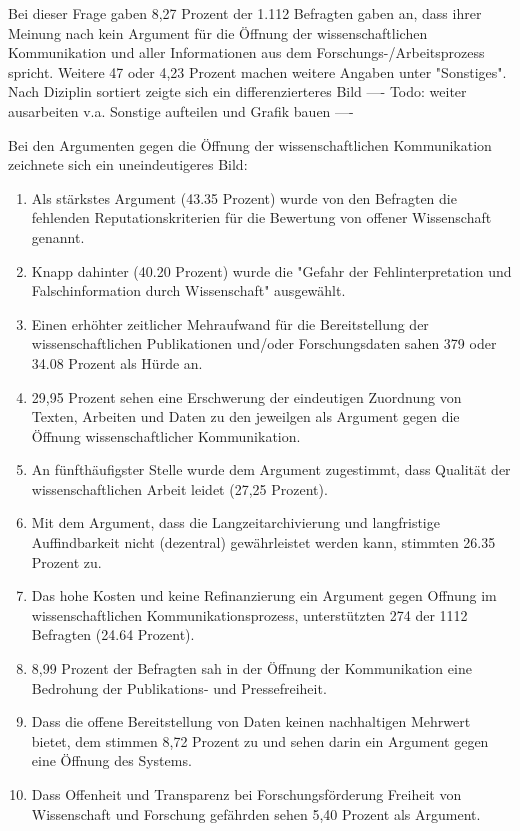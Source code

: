 Bei dieser Frage gaben 8,27 Prozent der 1.112 Befragten gaben an, dass ihrer Meinung nach kein Argument für die Öffnung der wissenschaftlichen Kommunikation und aller Informationen aus dem Forschungs-/Arbeitsprozess spricht. Weitere 47 oder 4,23 Prozent machen weitere Angaben unter "Sonstiges". Nach Diziplin sortiert zeigte sich ein differenzierteres Bild  ---- Todo: weiter ausarbeiten v.a. Sonstige aufteilen und Grafik bauen ----

Bei den Argumenten gegen die Öffnung der wissenschaftlichen Kommunikation zeichnete sich ein uneindeutigeres Bild:
\begin{enumerate}
\item Als stärkstes Argument (43.35 Prozent) wurde von den Befragten die fehlenden Reputationskriterien für die Bewertung von offener Wissenschaft genannt.   
\item Knapp dahinter (40.20 Prozent) wurde die "Gefahr der Fehlinterpretation und Falschinformation durch Wissenschaft" ausgewählt.
\item Einen erhöhter zeitlicher Mehraufwand für die Bereitstellung der wissenschaftlichen Publikationen und/oder Forschungsdaten sahen 379 oder 34.08 Prozent als Hürde an.
\item 29,95 Prozent sehen eine Erschwerung der eindeutigen Zuordnung von Texten, Arbeiten und Daten zu den jeweilgen als Argument gegen die Öffnung wissenschaftlicher Kommunikation.
\item  An fünfthäufigster Stelle wurde dem Argument zugestimmt, dass Qualität der wissenschaftlichen Arbeit leidet (27,25 Prozent).
\item Mit dem Argument, dass die Langzeitarchivierung und langfristige Auffindbarkeit nicht (dezentral) gewährleistet werden kann, stimmten 26.35 Prozent zu.
\item Das hohe Kosten und keine Refinanzierung ein Argument gegen Offnung im wissenschaftlichen Kommunikationsprozess, unterstützten 274 der 1112 Befragten (24.64 Prozent).
\item 8,99 Prozent der Befragten sah in der Öffnung der Kommunikation eine Bedrohung der Publikations- und Pressefreiheit.
\item Dass die offene Bereitstellung von Daten keinen nachhaltigen Mehrwert bietet, dem stimmen 8,72 Prozent zu und sehen darin ein Argument gegen eine Öffnung des Systems.
\item Dass Offenheit und Transparenz bei Forschungsförderung Freiheit von Wissenschaft und Forschung gefährden sehen 5,40 Prozent als Argument.  
\end{enumerate}

